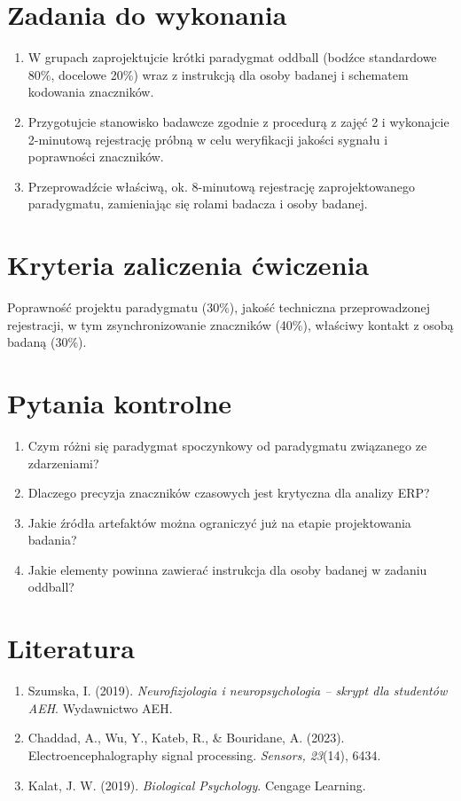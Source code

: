 \documentclass[11pt,a4paper]{article}
\begin{document}
\section{Zadania do wykonania}
\begin{enumerate}[label=\textbf{Zadanie \arabic*.}, leftmargin=2.7cm]
  \item W grupach zaprojektujcie krótki paradygmat oddball (bodźce standardowe 80\%, docelowe 20\%) wraz z instrukcją dla osoby badanej i schematem kodowania znaczników.
  \item Przygotujcie stanowisko badawcze zgodnie z procedurą z zajęć 2 i wykonajcie 2-minutową rejestrację próbną w celu weryfikacji jakości sygnału i poprawności znaczników.
  \item Przeprowadźcie właściwą, ok. 8-minutową rejestrację zaprojektowanego paradygmatu, zamieniając się rolami badacza i osoby badanej.
\end{enumerate}

\section{Kryteria zaliczenia ćwiczenia}
Poprawność projektu paradygmatu (30\%), jakość techniczna przeprowadzonej rejestracji, w tym zsynchronizowanie znaczników (40\%), właściwy kontakt z osobą badaną (30\%).

\section{Pytania kontrolne}
\begin{enumerate}[nosep]
  \item Czym różni się paradygmat spoczynkowy od paradygmatu związanego ze zdarzeniami?
  \item Dlaczego precyzja znaczników czasowych jest krytyczna dla analizy ERP?
  \item Jakie źródła artefaktów można ograniczyć już na etapie projektowania badania?
  \item Jakie elementy powinna zawierać instrukcja dla osoby badanej w zadaniu oddball?
\end{enumerate}

\section{Literatura}
\begin{enumerate}[nosep]
  \item Szumska, I. (2019). \emph{Neurofizjologia i neuropsychologia -- skrypt dla studentów AEH}. Wydawnictwo AEH.
  \item Chaddad, A., Wu, Y., Kateb, R., \& Bouridane, A. (2023). Electroencephalography signal processing. \emph{Sensors, 23}(14), 6434.
  \item Kalat, J. W. (2019). \emph{Biological Psychology}. Cengage Learning.
\end{enumerate}
\end{document}
